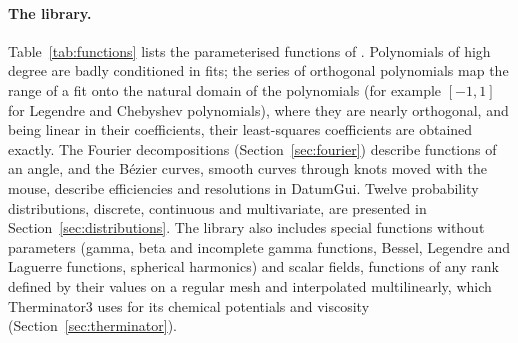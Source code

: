 \paragraph{The library.}
Table~\ref{tab:functions} lists the parameterised functions of \Datum{}. Polynomials of high degree are badly
conditioned in fits; the series of orthogonal polynomials map the range of a fit onto the natural domain of the
polynomials (for example $[-1,1]$ for Legendre and Chebyshev polynomials), where they are nearly orthogonal, and
being linear in their coefficients, their least-squares coefficients are obtained exactly. The Fourier decompositions
(Section~\ref{sec:fourier}) describe functions of an angle, and the B\'ezier curves, smooth curves through knots
moved with the mouse, describe efficiencies and resolutions in DatumGui. Twelve probability distributions, discrete,
continuous and multivariate, are presented in Section~\ref{sec:distributions}. The library also includes
special functions without parameters (gamma, beta and incomplete gamma functions, Bessel, Legendre and Laguerre functions, spherical harmonics) and scalar fields, functions of any rank defined by their values on a regular mesh and interpolated multilinearly, which Therminator3 uses for its chemical potentials and viscosity (Section~\ref{sec:therminator}).


